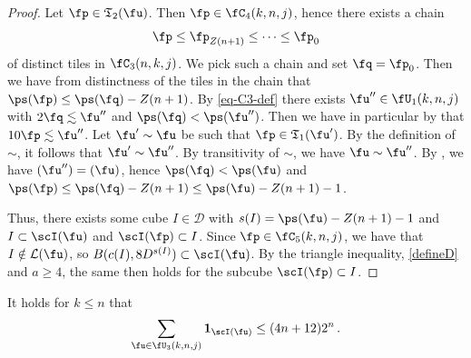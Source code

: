 \begin{proof}
    \leanok
    Let $\fp \in \mathfrak{T}_2(\fu)$. Then $\fp \in \fC_4(k,n,j)$, hence there exists a chain
    $$
        \fp \le \fp_{Z(n+1)} \le \dotsb \le \fp_0
    $$
    of distinct tiles in $\fC_3(n,k,j)$. We pick such a chain and set $\fq = \fp_0$.
    Then we have from distinctness of the tiles in the chain that
    $\ps(\fp) \le \ps(\fq) - Z(n+1)$.
    By \eqref{eq-C3-def} there exists $\fu'' \in \fU_1(k,n,j)$ with $2\fq \lesssim \fu''$ and $\ps(\fq) < \ps(\fu'')$.
    Then we have in particular by  that $10 \fp \lesssim \fu''$.
    Let $\fu' \sim \fu$ be such that $\fp \in \mathfrak{T}_1(\fu')$.
    By the definition of $\sim$, it follows that $\fu' \sim \fu''$.
    By transitivity of $\sim$, we have $\fu \sim \fu''$.
    By , we have $\sc(\fu'') = \sc(\fu)$, hence $\ps(\fq) < \ps(\fu)$ and $\ps(\fp) \le \ps(\fq) - Z(n+1) \le \ps(\fu) - Z(n+1) - 1$.

    Thus, there exists some cube $I \in \mathcal{D}$ with $s(I) = \ps(\fu) - Z(n+1) - 1$ and $I \subset \scI(\fu)$ and $\scI(\fp) \subset I$.
    Since $\fp \in \fC_5(k,n,j)$, we have that $I \notin \mathcal{L}(\fu)$, so $B(c(I), 8D^{s(I)}) \subset \scI(\fu)$.
    By the triangle inequality, \eqref{defineD} and $a \ge 4$, the same then holds for the subcube $\scI(\fp) \subset I$.
\end{proof}


\begin{lemma}
    \label{forest-stacking}
    \leanok
    It holds for $k\le n$ that
    \begin{equation}
        \sum_{\fu \in \fU_3(k,n,j)} \mathbf{1}_{\scI(\fu)} \le (4n+12)2^{n}\,.
    \end{equation}
\end{lemma}

